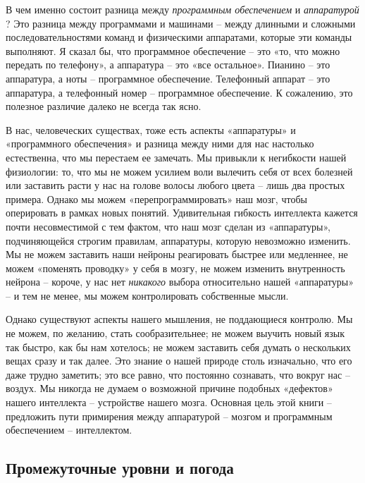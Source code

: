 \documentclass[../main.tex]{subfiles}
\begin{document}
В чем именно состоит разница между \emph{программным обеспечением} и \emph{аппаратурой} ? Это разница между программами и машинами \--- между длинными и сложными последовательностями команд и физическими аппаратами, которые эти команды выполняют. Я сказал бы, что программное обеспечение \--- это «то, что можно передать по телефону», а аппаратура \--- это «все остальное». Пианино \--- это аппаратура, а ноты \--- программное обеспечение. Телефонный аппарат \--- это аппаратура, а телефонный номер \--- программное обеспечение. К сожалению, это полезное различие далеко не всегда так ясно.

В нас, человеческих существах, тоже есть аспекты «аппаратуры» и «программного обеспечения» и разница между ними для нас настолько естественна, что мы перестаем ее замечать. Мы привыкли к негибкости нашей физиологии: то, что мы не можем усилием воли вылечить себя от всех болезней или заставить расти у нас на голове волосы любого цвета \--- лишь два простых примера. Однако мы можем «перепрограммировать» наш мозг, чтобы оперировать в рамках новых понятий. Удивительная гибкость интеллекта кажется почти несовместимой с тем фактом, что наш мозг сделан из «аппаратуры», подчиняющейся строгим правилам, аппаратуры, которую невозможно изменить. Мы не можем заставить наши нейроны реагировать быстрее или медленнее, не можем «поменять проводку» у себя в мозгу, не можем изменить внутренность нейрона \--- короче, у нас нет \emph{никакого} выбора относительно нашей «аппаратуры» \--- и тем не менее, мы можем контролировать собственные мысли.

Однако существуют аспекты нашего мышления, не поддающиеся контролю. Мы не можем, по желанию, стать сообразительнее; не можем выучить новый язык так быстро, как бы нам хотелось; не можем заставить себя думать о нескольких вещах сразу и так далее. Это знание о нашей природе столь изначально, что его даже трудно заметить; это все равно, что постоянно сознавать, что вокруг нас \--- воздух. Мы никогда не думаем о возможной причине подобных «дефектов» нашего интеллекта \--- устройстве нашего мозга. Основная цель этой книги \--- предложить пути примирения между аппаратурой \--- мозгом и программным обеспечением \--- интеллектом.


\subsection{Промежуточные уровни и погода}
\end{document}
